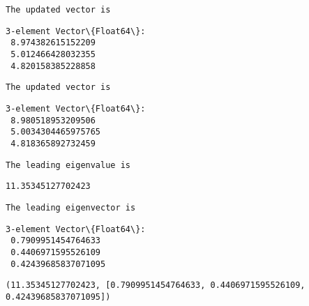 \documentclass[11pt]{article}
\makeatletter
\newcommand{\boxspacing}{\kern\kvtcb@left@rule\kern\kvtcb@boxsep}
\newcommand{\prompt}[4]{
        {\ttfamily\llap{{\color{#2}[#3]:\hspace{3pt}#4}}\vspace{-\baselineskip}}
    }
\makeatother
\begin{document}
    
    \begin{Verbatim}[commandchars=\\\{\}]
The updated vector is
    \end{Verbatim}

    
    \begin{Verbatim}[commandchars=\\\{\}]
3-element Vector\{Float64\}:
 8.974382615152209
 5.012466428032355
 4.820158385228858
    \end{Verbatim}

    
    \begin{Verbatim}[commandchars=\\\{\}]
The updated vector is
    \end{Verbatim}

    
    \begin{Verbatim}[commandchars=\\\{\}]
3-element Vector\{Float64\}:
 8.980518953209506
 5.0034304465975765
 4.818365892732459
    \end{Verbatim}

    
    \begin{Verbatim}[commandchars=\\\{\}]
The leading eigenvalue is
    \end{Verbatim}

    
    \begin{Verbatim}[commandchars=\\\{\}]
11.35345127702423
    \end{Verbatim}

    
    \begin{Verbatim}[commandchars=\\\{\}]
The leading eigenvector is
    \end{Verbatim}

    
    \begin{Verbatim}[commandchars=\\\{\}]
3-element Vector\{Float64\}:
 0.7909951454764633
 0.4406971595526109
 0.42439685837071095
    \end{Verbatim}

    
            \begin{tcolorbox}[breakable, size=fbox, boxrule=.5pt, pad at break*=1mm, opacityfill=0]
\prompt{Out}{outcolor}{153}{\boxspacing}
\begin{Verbatim}[commandchars=\\\{\}]
(11.35345127702423, [0.7909951454764633, 0.4406971595526109,
0.42439685837071095])
\end{Verbatim}
\end{tcolorbox}
        
\end{document}
